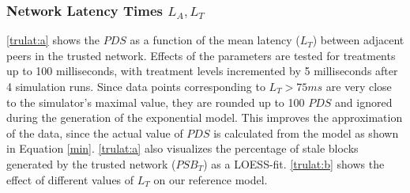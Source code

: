 \documentclass[a4paper,12pt,twoside]{report}
\begin{document}
\subsubsection{Network Latency Times $L_{A},L_T$}
\autoref{trulat:a} shows the $PDS$ as a function of the mean latency ($L_T$) between adjacent peers in the trusted network. Effects of the parameters are tested for treatments up to 100 milliseconds, with treatment levels incremented by 5 milliseconds after 4 simulation runs. Since data points corresponding to $L_T > 75ms$ are very close to the simulator's maximal value, they are rounded up to 100 $PDS$ and ignored during the generation of the exponential model. This improves the approximation of the data, since the actual value of $PDS$ is calculated from the model as shown in Equation \ref{min}. \autoref{trulat:a} also visualizes the percentage of stale blocks generated by the trusted network ($PSB_T$) as a LOESS-fit. \autoref{trulat:b} shows the effect of different values of $L_T$ on our reference model.
\end{document}
